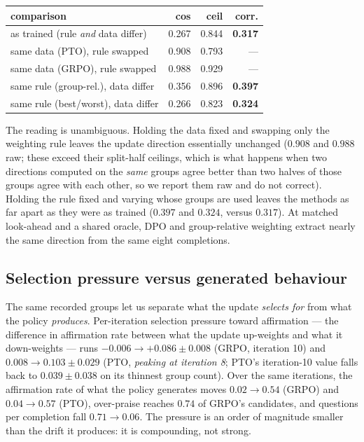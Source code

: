 \begin{center}\small
\setlength{\tabcolsep}{3pt}
\begin{tabular}{@{}lrrr@{}}
\toprule
comparison & cos & ceil & corr. \\
\midrule
as trained (rule \emph{and} data differ) & 0.267 & 0.844 & \textbf{0.317} \\
\midrule
same data (PTO), rule swapped   & 0.908 & 0.793 & --- \\
same data (GRPO), rule swapped  & 0.988 & 0.929 & --- \\
\midrule
same rule (group-rel.), data differ & 0.356 & 0.896 & \textbf{0.397} \\
same rule (best/worst), data differ & 0.266 & 0.823 & \textbf{0.324} \\
\bottomrule
\end{tabular}
\end{center}

The reading is unambiguous. Holding the data fixed and swapping only the weighting rule leaves
the update direction essentially unchanged ($0.908$ and $0.988$ raw; these exceed their split-half
ceilings, which is what happens when two directions computed on the \emph{same} groups agree
better than two halves of those groups agree with each other, so we report them raw and do not
correct). Holding the rule fixed and varying whose groups are used leaves the methods as far apart
as they were as trained ($0.397$ and $0.324$, versus $0.317$). At matched look-ahead and a shared
oracle, DPO and group-relative weighting extract nearly the same direction from the same eight
completions.

\subsection{Selection pressure versus generated behaviour}
The same recorded groups let us separate what the update \emph{selects for} from what the policy
\emph{produces}. Per-iteration selection pressure toward affirmation --- the difference in
affirmation rate between what the update up-weights and what it down-weights --- runs
$-0.006\rightarrow+0.086\pm0.008$ (GRPO, iteration 10) and $0.008\rightarrow0.103\pm0.029$
(PTO, \emph{peaking at iteration 8}; PTO's iteration-10 value falls back to $0.039\pm0.038$ on
its thinnest group count). Over the same
iterations, the affirmation rate of what the policy generates moves $0.02\rightarrow0.54$ (GRPO)
and $0.04\rightarrow0.57$ (PTO), over-praise reaches $0.74$ of GRPO's candidates, and questions
per completion fall $0.71\rightarrow0.06$. The pressure is an order of magnitude smaller than the
drift it produces: it is compounding, not strong.

